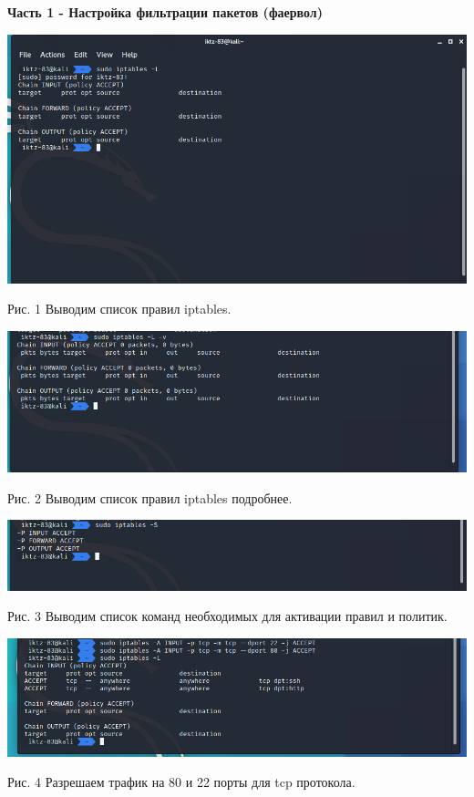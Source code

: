 \documentclass[a4paper,14pt]{extarticle}
\begin{document}
    \textbf{Часть 1 - Настройка фильтрации пакетов (фаервол)}
    \begin{center}

        \includegraphics[scale=0.5]{pics/1.png}

        Рис. 1 Выводим список правил iptables.

        \includegraphics[scale=0.5]{pics/2.png}

        Рис. 2 Выводим список правил iptables подробнее.

        \includegraphics[scale=0.5]{pics/3.png}

        Рис. 3 Выводим список команд необходимых для активации правил и политик.

        \includegraphics[scale=0.5]{pics/4.png}

        Рис. 4 Разрешаем трафик на 80 и 22 порты для tcp протокола.


\end{center}
\end{document}
